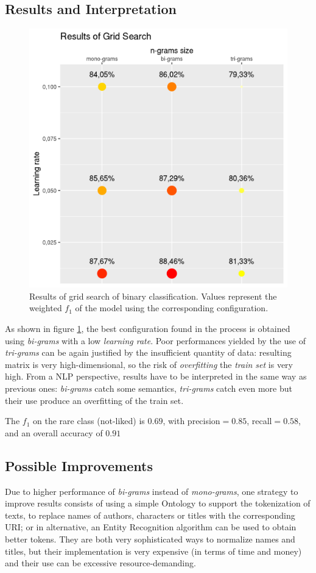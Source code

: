 \documentclass[fleqn,10pt]{SelfArx}
\begin{document}
\subsection{Results and Interpretation}
\begin{figure}[!h]
  \center
  \includegraphics[width=0.8\linewidth]{binary_class_grid_search.png}
  \caption{Results of grid search of binary classification. Values represent the weighted $f_1$ of the model using the corresponding configuration.}
  \label{fig:grid_search_binary}
\end{figure}
As shown in figure \ref{fig:grid_search_binary}, the best configuration found in the process is obtained using \textit{bi-grams} with a low \textit{learning rate}.
Poor performances yielded by the use of \textit{tri-grams} can be again justified by the insufficient quantity of data: resulting matrix is very high-dimensional, so the risk of \textit{overfitting} the \textit{train set} is very high.
From a NLP perspective, results have to be interpreted in the same way as previous ones: \textit{bi-grams} catch some semantics, \textit{tri-grams} catch even more but their use produce an overfitting of the train set.

The $f_1$ on the rare class (not-liked) is $0.69$, with precision$=0.85$, recall$=0.58$, and an overall accuracy of $0.91$

\subsection{Possible Improvements}
Due to higher performance of \textit{bi-grams} instead of \textit{mono-grams}, one strategy to improve results consists of using a simple Ontology to support the tokenization of texts, to replace names of authors, characters or titles with the corresponding URI; or in alternative, an Entity Recognition algorithm can be used to obtain better tokens.
They are both very sophisticated ways to normalize names and titles, but their implementation is very expensive (in terms of time and money) and their use can be excessive resource-demanding.
\end{document}
